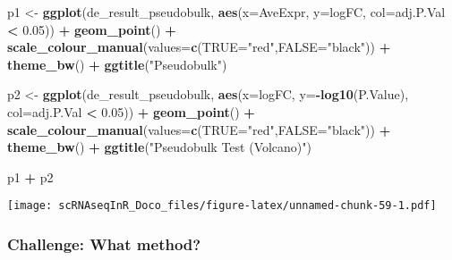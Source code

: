 \documentclass[
]{book}
\newenvironment{Shaded}{\begin{snugshade}}{\end{snugshade}}
\newcommand{\AttributeTok}[1]{\textcolor[rgb]{0.13,0.29,0.53}{#1}}
\newcommand{\FloatTok}[1]{\textcolor[rgb]{0.00,0.00,0.81}{#1}}
\newcommand{\FunctionTok}[1]{\textcolor[rgb]{0.13,0.29,0.53}{\textbf{#1}}}
\newcommand{\NormalTok}[1]{#1}
\newcommand{\OtherTok}[1]{\textcolor[rgb]{0.56,0.35,0.01}{#1}}
\newcommand{\SpecialCharTok}[1]{\textcolor[rgb]{0.81,0.36,0.00}{\textbf{#1}}}
\newcommand{\StringTok}[1]{\textcolor[rgb]{0.31,0.60,0.02}{#1}}
\begin{document}
\begin{Shaded}
\begin{Highlighting}[]
\NormalTok{p1 }\OtherTok{\textless{}{-}} \FunctionTok{ggplot}\NormalTok{(de\_result\_pseudobulk, }\FunctionTok{aes}\NormalTok{(}\AttributeTok{x=}\NormalTok{AveExpr, }\AttributeTok{y=}\NormalTok{logFC, }\AttributeTok{col=}\NormalTok{adj.P.Val }\SpecialCharTok{\textless{}} \FloatTok{0.05}\NormalTok{)) }\SpecialCharTok{+}
  \FunctionTok{geom\_point}\NormalTok{() }\SpecialCharTok{+}
  \FunctionTok{scale\_colour\_manual}\NormalTok{(}\AttributeTok{values=}\FunctionTok{c}\NormalTok{(}\StringTok{\textquotesingle{}TRUE\textquotesingle{}}\OtherTok{=}\StringTok{"red"}\NormalTok{,}\StringTok{\textquotesingle{}FALSE\textquotesingle{}}\OtherTok{=}\StringTok{"black"}\NormalTok{)) }\SpecialCharTok{+} 
  \FunctionTok{theme\_bw}\NormalTok{() }\SpecialCharTok{+}
  \FunctionTok{ggtitle}\NormalTok{(}\StringTok{"Pseudobulk"}\NormalTok{)}


\NormalTok{p2 }\OtherTok{\textless{}{-}} \FunctionTok{ggplot}\NormalTok{(de\_result\_pseudobulk, }\FunctionTok{aes}\NormalTok{(}\AttributeTok{x=}\NormalTok{logFC, }\AttributeTok{y=}\SpecialCharTok{{-}}\FunctionTok{log10}\NormalTok{(P.Value), }\AttributeTok{col=}\NormalTok{adj.P.Val }\SpecialCharTok{\textless{}} \FloatTok{0.05}\NormalTok{)) }\SpecialCharTok{+}
  \FunctionTok{geom\_point}\NormalTok{() }\SpecialCharTok{+}
  \FunctionTok{scale\_colour\_manual}\NormalTok{(}\AttributeTok{values=}\FunctionTok{c}\NormalTok{(}\StringTok{\textquotesingle{}TRUE\textquotesingle{}}\OtherTok{=}\StringTok{"red"}\NormalTok{,}\StringTok{\textquotesingle{}FALSE\textquotesingle{}}\OtherTok{=}\StringTok{"black"}\NormalTok{)) }\SpecialCharTok{+} 
  \FunctionTok{theme\_bw}\NormalTok{() }\SpecialCharTok{+}
  \FunctionTok{ggtitle}\NormalTok{(}\StringTok{"Pseudobulk Test (Volcano)"}\NormalTok{)}

\NormalTok{p1 }\SpecialCharTok{+}\NormalTok{ p2}
\end{Highlighting}
\end{Shaded}

\texttt{[image: scRNAseqInR\_Doco\_files/figure-latex/unnamed-chunk-59-1.pdf]}

\hypertarget{challenge-what-method}{%
\subsubsection*{Challenge: What method?}\label{challenge-what-method}}
\end{document}
